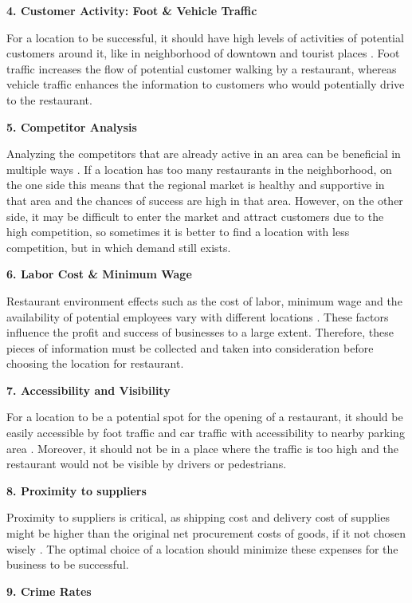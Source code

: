 \documentclass[a4paper, 11pt, oneside]{Thesis}  %
\begin{document}
\textbf{4.	Customer Activity: Foot \& Vehicle Traffic}

For a location to be successful, it should have high levels of activities of potential customers around it, like in neighborhood of downtown and tourist places \cite{EvanTarver.21.04.2017}. Foot traffic increases the flow of potential customer walking by a restaurant, whereas vehicle traffic enhances the information to customers who would potentially drive to the restaurant.


\textbf{5.	Competitor Analysis}

Analyzing the competitors that are already active in an area can be beneficial in multiple ways \cite{EvanTarver.21.04.2017}. If a location has too many restaurants in the neighborhood, on the one side this means that the regional market is healthy and supportive in that area and the chances of success are high in that area. However, on the other side, it may be difficult to enter the market and attract customers due to the high competition, so sometimes it is better to find a location with less competition, but in which demand still exists. 

\textbf{6.	Labor Cost \& Minimum Wage}

Restaurant environment effects such as the cost of labor, minimum wage and the availability of potential employees vary with different locations \cite{Webstaurantstore.com.25.07.2018}. These factors influence the profit and success of businesses to a large extent. Therefore, these pieces of information must be collected and taken into consideration before choosing the location for restaurant.

\textbf{7.	Accessibility and Visibility}

For a location to be a potential spot for the opening of a restaurant, it should be easily accessible by foot traffic and car traffic with accessibility to nearby parking area \cite{Webstaurantstore.com.25.07.2018}. Moreover, it should not be in a place where the traffic is too high and the restaurant would not be visible by drivers or pedestrians.

\textbf{8.	Proximity to suppliers}

Proximity to suppliers is critical, as shipping cost and delivery cost of supplies might be higher than the original net procurement costs of goods, if it not chosen wisely \cite{Webstaurantstore.com.25.07.2018}. The optimal choice of a location should minimize these expenses for the business to be successful.

\textbf{9.	Crime Rates}
\end{document}
